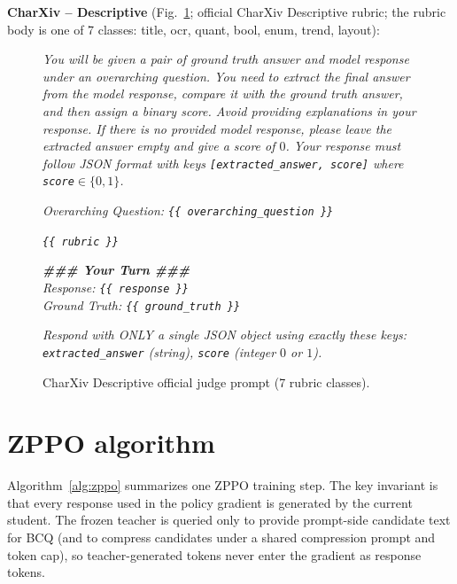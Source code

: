 \documentclass{llmxive}
\begin{document}
\textbf{CharXiv -- Descriptive} (Fig.~\ref{fig:prompt-judge-charxiv-d}; official CharXiv Descriptive rubric; the rubric body is one of 7 classes: title, ocr, quant, bool, enum, trend, layout):
\begin{figure}[!htbp]
\begin{prompttemplatefig}
\small
\emph{You will be given a pair of ground truth answer and model response under an overarching question. You need to extract the final answer from the model response, compare it with the ground truth answer, and then assign a binary score. Avoid providing explanations in your response. If there is no provided model response, please leave the extracted answer empty and give a score of $0$. Your response must follow JSON format with keys \texttt{[extracted\_answer, score]} where \texttt{score}$\in\{0,1\}$.}

\emph{Overarching Question: \texttt{\{\{ overarching\_question \}\}}}

\emph{\texttt{\{\{ rubric \}\}}}

\emph{\textbf{\#\#\# Your Turn \#\#\#}\\
Response: \texttt{\{\{ response \}\}}\\
Ground Truth: \texttt{\{\{ ground\_truth \}\}}}

\emph{Respond with ONLY a single JSON object using exactly these keys: \texttt{extracted\_answer} (string), \texttt{score} (integer $0$ or $1$).}
\end{prompttemplatefig}
\caption{CharXiv Descriptive official judge prompt (7 rubric classes).}
\label{fig:prompt-judge-charxiv-d}
\end{figure}


\section{ZPPO algorithm}
\label{sec:appendix:algorithm}

Algorithm~\ref{alg:zppo} summarizes one ZPPO training step. The key invariant is that every response used in the policy gradient is generated by the current student. The frozen teacher is queried only to provide prompt-side candidate text for BCQ (and to compress candidates under a shared compression prompt and token cap), so teacher-generated tokens never enter the gradient as response tokens.
\end{document}
